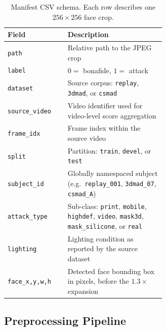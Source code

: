 \documentclass[anonymous, manuscript, screen, review]{acmart}
\begin{document}
\begin{table}[htbp]
\centering
\caption{Manifest CSV schema. Each row describes one $256{\times}256$ face crop.}
\label{tab:schema}
\small
\begin{tabular}{l p{0.62\linewidth}}
\toprule
Field & Description \\
\midrule
\texttt{path}           & Relative path to the JPEG crop \\
\texttt{label}          & $0 =$ bonafide, $1 =$ attack \\
\texttt{dataset}        & Source corpus: \texttt{replay}, \texttt{3dmad}, or \texttt{csmad} \\
\texttt{source\_video}  & Video identifier used for video-level score aggregation \\
\texttt{frame\_idx}     & Frame index within the source video \\
\texttt{split}          & Partition: \texttt{train}, \texttt{devel}, or \texttt{test} \\
\texttt{subject\_id}    & Globally namespaced subject (e.g.\ \texttt{replay\_001}, \texttt{3dmad\_07}, \texttt{csmad\_A}) \\
\texttt{attack\_type}   & Sub-class: \texttt{print}, \texttt{mobile}, \texttt{highdef}, \texttt{video}, \texttt{mask3d}, \texttt{mask\_silicone}, or \texttt{real} \\
\texttt{lighting}       & Lighting condition as reported by the source dataset \\
\texttt{face\_x,y,w,h} & Detected face bounding box in pixels, before the $1.3{\times}$ expansion \\
\bottomrule
\end{tabular}
\end{table}

\subsection{Preprocessing Pipeline}
\end{document}
